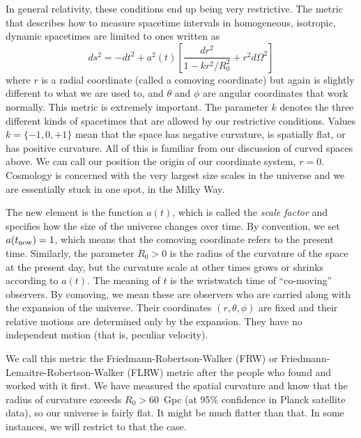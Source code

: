 In general relativity, these conditions end up being very restrictive.  The metric that describes how to measure spacetime intervals in homogeneous, isotropic, dynamic spacetimes are limited to ones written as
\begin{equation}
  ds^2 = -dt^2 + a^2(t)\left[ \frac{dr^2}{1 - kr^2/R_0^2} + r^2 d\Omega^2  \right] \label{eqn:FRW}
\end{equation}
where $r$ is a radial coordinate (called a comoving coordinate) but again is slightly different to what we are used to, and $\theta$ and $\phi$ are angular coordinates that work normally.  This metric is extremely important.  The parameter $k$ denotes the three different kinds of spacetimes that are allowed by our restrictive conditions.  Values $k = \{ -1, 0, +1 \}$ mean that the space has negative curvature, is spatially flat, or has positive curvature.    All of this is familiar from our discussion of curved spaces above. We can call our position the origin of our coordinate system, $r=0$. 
Cosmology is concerned with the very largest size scales in the universe and we are essentially stuck in one spot, in the Milky Way. 

The new element is the function $a(t)$, which is called the \textit{scale factor} and specifies how the size of the universe changes over time.  By convention, we set $a(t_{\rm now}) = 1$, which means that the comoving coordinate refers to the present time. Similarly, the parameter $R_0 > 0$ is the radius of the curvature of the space at the present day, but the curvature scale at other times grows or shrinks according to $a(t)$.  The meaning of $t$ is the wristwatch time of ``co-moving'' observers.  By comoving, we mean these are observers who are carried along with the expansion of the universe.  Their coordinates $(r,\theta,\phi)$ are fixed and their relative motions are determined only by the expansion.  They have no independent motion (that is, peculiar velocity).

We call this metric the Friedmann-Robertson-Walker (FRW) or Friedmann-Lemaitre-Robertson-Walker (FLRW) metric after the people who found and worked with it first.  We have measured the spatial curvature and know that the radius of curvature exceeds $R_0 > 60$\ Gpc (at 95\% confidence in Planck satellite data), so our universe is fairly flat.  It might be much flatter than that.  In some instances, we will restrict to that the case.


